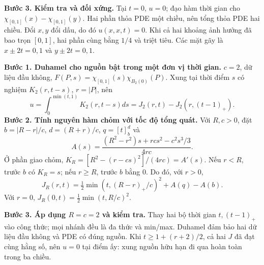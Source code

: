 \textbf{Bước 3. Kiểm tra và đối xứng.} Tại $t=0$, $u=0$; đạo hàm thời gian cho $\chi_{[0,1]}(x)-\chi_{[0,1]}(y)$. Hai phần thỏa PDE một chiều, nên tổng thỏa PDE hai chiều. Đổi $x,y$ đổi dấu, do đó $u(x,x,t)=0$. Khi cả hai khoảng ảnh hưởng đã bao trọn $[0,1]$, hai phần cùng bằng $1/4$ và triệt tiêu. Các mặt gãy là $x\pm2t=0,1$ và $y\pm2t=0,1$.

\textbf{Bước 1. Duhamel cho nguồn bật trong một đơn vị thời gian.} $c=2$, dữ liệu đầu không, $F(P,s)=\chi_{[0,1]}(s)\chi_{B_2(0)}(P)$. Xung tại thời điểm $s$ có nghiệm $K_2(r,t-s)$, $r=|P|$, nên
\[u=\int_0^{\min(t,1)}K_2(r,t-s)ds=J_2(r,t)-J_2(r,(t-1)_+).\]
\textbf{Bước 2. Tính nguyên hàm chỏm với tốc độ tổng quát.} Với $R,c>0$, đặt $b=|R-r|/c$, $d=(R+r)/c$, $q=[t]_b^d$ và
\[A(s)=\frac{(R^2-r^2)s+rcs^2-c^2s^3/3}{4rc}.\]
Ở phần giao chỏm, $K_R=[R^2-(r-cs)^2]/(4rc)=A'(s)$. Nếu $r<R$, trước $b$ có $K_R=s$; nếu $r\ge R$, trước $b$ bằng $0$. Do đó, với $r>0$,
\[J_R(r,t)=\tfrac12\min(t,(R-r)_+/c)^2+A(q)-A(b).\]
Với $r=0$, $J_R(0,t)=\frac12\min(t,R/c)^2$.

\textbf{Bước 3. Áp dụng $R=c=2$ và kiểm tra.} Thay hai bộ thời gian $t,(t-1)_+$ vào công thức; mọi nhánh đều là đa thức và min/max. Duhamel đảm bảo hai dữ liệu đầu không và PDE có đúng nguồn. Khi $t\ge1+(r+2)/2$, cả hai $J$ đã đạt cùng hằng số, nên $u=0$ tại điểm ấy: xung nguồn hữu hạn đi qua hoàn toàn trong ba chiều.
